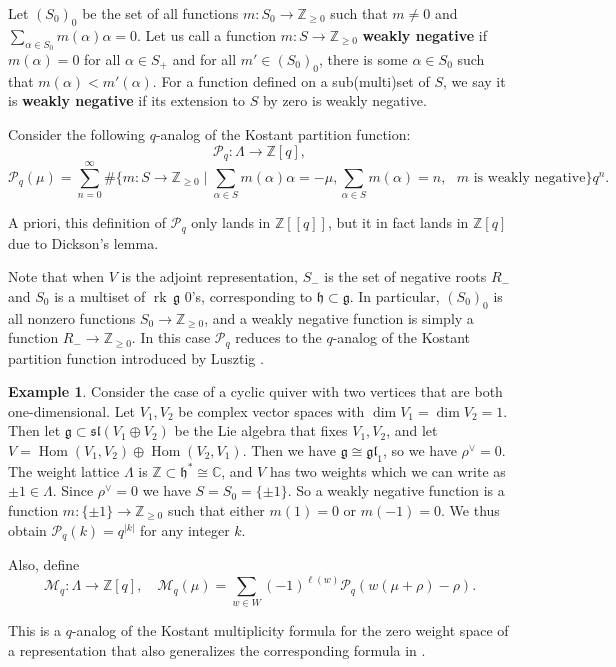 \documentclass[12pt]{article}
\newcommand{\Z}{\mathbb{Z}}
\newcommand{\C}{\mathbb{C}}
\renewcommand{\sl}{\mathfrak{sl}}
\DeclareMathOperator{\rk}{rk}
\theoremstyle{definition}
\newtheorem{example}[theorem]{Example}
\theoremstyle{remark}
\newcommand{\g}{\mathfrak{g}}
\renewcommand{\P}{\mathcal{P}}
\newcommand{\M}{\mathcal{M}}
\newcommand{\h}{\mathfrak{h}}
\DeclareMathOperator{\Hom}{Hom}
\newcommand{\gl}{\mathfrak{gl}}
\begin{document}
Let $(S_0)_0$ be the set of all functions $m\colon S_0\to\Z_{\geq 0}$ such that $m\neq 0$ and $\sum_{\alpha\in S_0}m(\alpha)\alpha=0$. Let us call a function $m:S\to\Z_{\geq 0}$ \textbf{weakly negative} if $m(\alpha)=0$ for all $\alpha\in S_+$ and for all $m'\in (S_0)_0$, there is some $\alpha\in S_0$ such that $m(\alpha)<m'(\alpha)$. For a function defined on a sub(multi)set of $S$, we say it is \textbf{weakly negative} if its extension to $S$ by zero is weakly negative.

Consider the following $q$-analog of the Kostant partition function:
\[\P_q\colon\Lambda\to\Z[q],\]
\[
    \P_q(\mu)=\sum_{n=0}^\infty\#\Big\{m\colon S\to\Z_{\geq 0}\mid\sum_{\alpha\in S}m(\alpha)\alpha=-\mu,\sum_{\alpha\in S}m(\alpha)=n,\text{ $m$ is weakly negative}\Big\}q^n.
\]

A priori, this definition of $\P_q$ only lands in $\Z[[q]]$, but it in fact lands in $\Z[q]$ due to Dickson's lemma.

Note that when $V$ is the adjoint representation, $S_-$ is the set of negative roots $R_-$ and $S_0$ is a multiset of $\rk\,\g$ $0$'s, corresponding to $\h\subset\g$. In particular, $(S_0)_0$ is all nonzero functions $S_0\to\Z_{\geq 0}$, and a weakly negative function is simply a function $R_-\to\Z_{\geq 0}$. In this case $\P_q$ reduces to the $q$-analog of the Kostant partition function introduced by Lusztig \cite{lusztigqkostant}.

\begin{example}\label{eg:1,1}
    Consider the case of a cyclic quiver with two vertices that are both one-dimensional. Let $V_1,V_2$ be complex vector spaces with $\dim V_1=\dim V_2=1$. Then let $\g\subset\sl(V_1\oplus V_2)$ be the Lie algebra that fixes $V_1,V_2$, and let $V=\Hom(V_1,V_2)\oplus\Hom(V_2,V_1)$. Then we have $\g\cong\gl_1$, so we have $\rho^\vee=0$. The weight lattice $\Lambda$ is $\Z\subset\h^*\cong\C$, and $V$ has two weights which we can write as $\pm 1\in\Lambda$. Since $\rho^\vee=0$ we have $S=S_0=\{\pm 1\}$. So a weakly negative function is a function $m\colon\{\pm 1\}\to\Z_{\geq 0}$ such that either $m(1)=0$ or $m(-1)=0$. We thus obtain $\P_q(k)=q^{|k|}$ for any integer $k$. 
\end{example}

Also, define
\[\M_q\colon \Lambda\to\Z[q],\quad \M_q(\mu)=\sum_{w\in W}(-1)^{\ell(w)}\P_q(w(\mu+\rho)-\rho).\]

This is a $q$-analog of the Kostant multiplicity formula for the zero weight space of a representation that also generalizes the corresponding formula in \cite{lusztigqkostant}.
\end{document}
